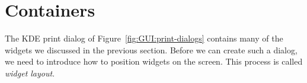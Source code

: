 


\section{Containers}
\label{sec:GUI:basic-components-containers}






The KDE print dialog of Figure~\ref{fig:GUI:print-dialogs} contains
many of the widgets we discussed in the previous section. Before we
can create such a dialog, we need to introduce how to position widgets
on the screen. This process is called \textit{widget layout}.

